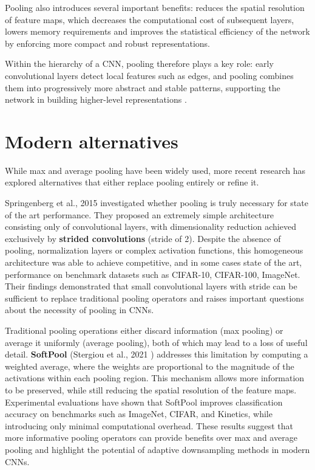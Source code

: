 Pooling also introduces several important benefits: reduces the spatial resolution of feature maps, which decreases the computational cost of subsequent layers, lowers memory requirements and improves the statistical efficiency of the network by enforcing more compact and robust representations.  

Within the hierarchy of a CNN, pooling therefore plays a key role: early convolutional layers detect local features such as edges, and pooling combines them into progressively more abstract and stable patterns, supporting the network in building higher-level representations \cite{goodfellow2016deep}.


\section{Modern alternatives}
\label{sec:pooling-alternatives}%

While max and average pooling have been widely used, more recent research has explored alternatives that either replace pooling entirely or refine it.  

Springenberg et al., 2015 \cite{springenberg2015allcnn} investigated whether pooling is truly necessary for state of the art performance. They proposed an extremely simple architecture consisting only of convolutional layers, with dimensionality reduction achieved exclusively by \textbf{strided convolutions} (stride of 2).  
Despite the absence of pooling, normalization layers or complex activation functions, this homogeneous architecture was able to achieve competitive, and in some cases state of the art, performance on benchmark datasets such as CIFAR-10, CIFAR-100, ImageNet.   Their findings demonstrated that small convolutional layers with stride can be sufficient to replace traditional pooling operators and raises important questions about the necessity of pooling in CNNs.
 
Traditional pooling operations either discard information (max pooling) or average it uniformly (average pooling), both of which may lead to a loss of useful detail.  
\textbf{SoftPool} (Stergiou et al., 2021 \cite{stergiou2021softpool}) addresses this limitation by computing a weighted average, where the weights are proportional to the magnitude of the activations within each pooling region.  
This mechanism allows more information to be preserved, while still reducing the spatial resolution of the feature maps. Experimental evaluations have shown that SoftPool improves classification accuracy on benchmarks such as ImageNet, CIFAR, and Kinetics, while introducing only minimal computational overhead.  
These results suggest that more informative pooling operators can provide benefits over max and average pooling and highlight the potential of adaptive downsampling methods in modern CNNs.